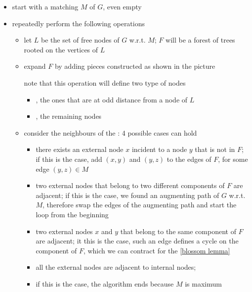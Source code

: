 \documentclass[a4paper, 12pt]{report}
\begin{document}
    \begin{itemize}
        \item start with a matching $M$ of $G$, even empty
        \item repeatedly perform the following operations
            \begin{itemize}
                \item let $L$ be the set of free nodes of $G$ w.r.t. $M$; $F$ will be a forest of trees rooted on the vertices of $L$
                \item expand $F$ by adding pieces constructed as shown in the picture
                    
                    note that this operation will define two type of nodes
                    
                    \begin{itemize}
                        \item {}, the ones that are at odd distance from a node of $L$
                        \item {}, the remaining nodes
                    \end{itemize}

                \item consider the neighbours of the : 4 possible cases can hold
                    \begin{itemize}
                        \item there exists an external node $x$ incident to a node $y$ that is not in $F$; if this is the case, add $(x, y)$ and $(y,z)$ to the edges of $F$, for some edge $(y,z) \in M$
                        \item two external nodes that belong to two different components of $F$ are adjacent; if this is the case, we found an augmenting path of $G$ w.r.t. $M$, therefore swap the edges of the augmenting path and start the loop from the beginning
                        \item two external nodes $x$ and $y$ that belong to the same component of $F$ are adjacent; it this is the case, such an edge defines a cycle on the component of $F$, which we can contract for the \cref{blossom lemma}
                        \item all the external nodes are adjacent to internal nodes; \item if this is the case, the algorithm ends because $M$ is maximum
                    \end{itemize}
            \end{itemize}
    \end{itemize}
\end{document}
